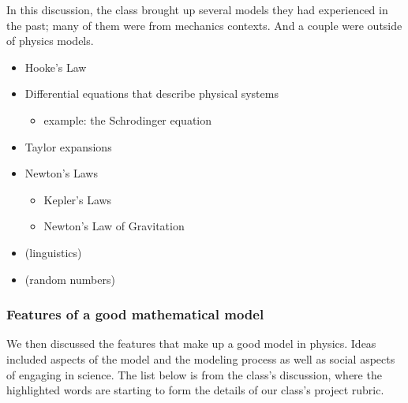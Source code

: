 \documentclass[letterpaper,10pt,english]{jupyterBook}
\begin{document}
\sphinxAtStartPar
In this discussion, the class brought up several models they had experienced in the past; many of them were from mechanics contexts. And a couple were outside of physics models.

\sphinxAtStartPar
{}
\begin{itemize}
\item {} 
\sphinxAtStartPar
Hooke’s Law

\item {} 
\sphinxAtStartPar
Differential equations that describe physical systems
\begin{itemize}
\item {} 
\sphinxAtStartPar
example: the Schrodinger equation

\end{itemize}

\item {} 
\sphinxAtStartPar
Taylor expansions

\item {} 
\sphinxAtStartPar
Newton’s Laws
\begin{itemize}
\item {} 
\sphinxAtStartPar
Kepler’s Laws

\item {} 
\sphinxAtStartPar
Newton’s Law of Gravitation

\end{itemize}

\end{itemize}

\sphinxAtStartPar
{}
\begin{itemize}
\item {} 
\sphinxAtStartPar
{} (linguistics)

\item {} 
\sphinxAtStartPar
{} (random numbers)

\end{itemize}


\subsubsection{Features of a good mathematical model}
\label{\detokenize{content/1_modeling/notes-what_is_a_model:features-of-a-good-mathematical-model}}
\sphinxAtStartPar
We then discussed the features that make up a good model in physics. Ideas included aspects of the model and the modeling process as well as social aspects of engaging in science. The list below is from the class’s discussion, where the highlighted words are starting to form the details of our class’s project rubric.
\end{document}

